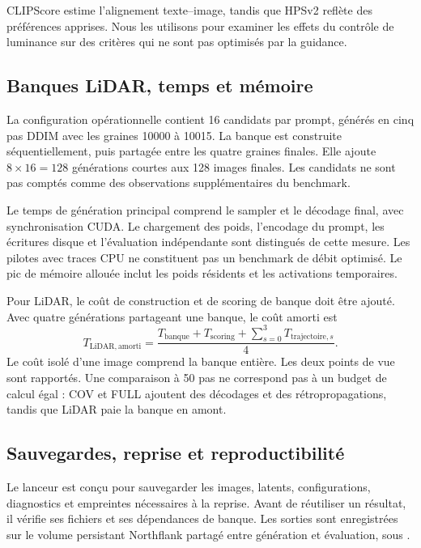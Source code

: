 \documentclass[11pt,a4paper]{article}
\newcommand{\code}[1]{\texttt{\detokenize{#1}}}
\begin{document}
CLIPScore estime l'alignement texte--image, tandis que HPSv2 reflète des préférences apprises. Nous les utilisons pour examiner les effets du contrôle de luminance sur des critères qui ne sont pas optimisés par la guidance.

\subsection{Banques LiDAR, temps et mémoire}
La configuration opérationnelle contient 16 candidats par prompt, générés en cinq pas DDIM avec les graines 10000 à 10015. La banque est construite séquentiellement, puis partagée entre les quatre graines finales. Elle ajoute $8\times16=128$ générations courtes aux 128 images finales. Les candidats ne sont pas comptés comme des observations supplémentaires du benchmark.

Le temps de génération principal comprend le sampler et le décodage final, avec synchronisation CUDA. Le chargement des poids, l'encodage du prompt, les écritures disque et l'évaluation indépendante sont distingués de cette mesure. Les pilotes avec traces CPU ne constituent pas un benchmark de débit optimisé. Le pic de mémoire allouée inclut les poids résidents et les activations temporaires.

Pour LiDAR, le coût de construction et de scoring de banque doit être ajouté. Avec quatre générations partageant une banque, le coût amorti est
\begin{equation}\label{eq:cost}
T_{\mathrm{LiDAR,amorti}}=
\frac{T_{\mathrm{banque}}+T_{\mathrm{scoring}}+\sum_{s=0}^{3}T_{\mathrm{trajectoire},s}}{4}.
\end{equation}
Le coût isolé d'une image comprend la banque entière. Les deux points de vue sont rapportés. Une comparaison à 50 pas ne correspond pas à un budget de calcul égal : COV et FULL ajoutent des décodages et des rétropropagations, tandis que LiDAR paie la banque en amont.

\subsection{Sauvegardes, reprise et reproductibilité}
Le lanceur est conçu pour sauvegarder les images, latents, configurations, diagnostics et empreintes nécessaires à la reprise. Avant de réutiliser un résultat, il vérifie ses fichiers et ses dépendances de banque. Les sorties sont enregistrées sur le volume persistant Northflank partagé entre génération et évaluation, sous \code{/data}.
\end{document}

